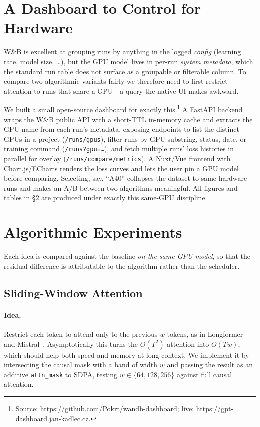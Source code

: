 \documentclass[11pt]{article}
\begin{document}
\section{A Dashboard to Control for Hardware}
\label{sec:dashboard}

W\&B is excellent at grouping runs by anything in the logged \emph{config}
(learning rate, model size, \dots), but the GPU model lives in per-run
\emph{system metadata}, which the standard run table does not surface as a
groupable or filterable column. To compare two algorithmic variants fairly we
therefore need to first restrict attention to runs that share a GPU---a query the
native UI makes awkward.

We built a small open-source dashboard for exactly this.\footnote{Source:
\url{https://github.com/Pokrt/wandb-dashboard}; live:
\url{https://gpt-dashboard.jan-kadlec.cz}.} A FastAPI backend wraps the W\&B public
API with a short-TTL in-memory cache and extracts the GPU name from each run's
metadata, exposing endpoints to list the distinct GPUs in a project
(\texttt{/runs/gpus}), filter runs by GPU substring, status, date, or training
command (\texttt{/runs?gpu=\dots}), and fetch multiple runs' loss histories in
parallel for overlay (\texttt{/runs/compare/metrics}). A Nuxt/Vue frontend with
Chart.js/ECharts renders the loss curves and lets the user pin a GPU model before
comparing. Selecting, say, ``A40'' collapses the dataset to same-hardware runs and
makes an A/B between two algorithms meaningful. All figures and tables in
\S\ref{sec:experiments} are produced under exactly this same-GPU discipline.

\section{Algorithmic Experiments}
\label{sec:experiments}

Each idea is compared against the baseline \emph{on the same GPU model}, so that
the residual difference is attributable to the algorithm rather than the
scheduler.

\subsection{Sliding-Window Attention}

\paragraph{Idea.} Restrict each token to attend only to the previous $w$ tokens,
as in Longformer~\cite{beltagy2020longformer} and Mistral~\cite{jiang2023mistral}.
Asymptotically this turns the $O(T^2)$ attention into $O(Tw)$, which should help
both speed and memory at long context. We implement it by intersecting the causal
mask with a band of width $w$ and passing the result as an additive
\texttt{attn\_mask} to SDPA, testing $w\in\{64,128,256\}$ against full causal
attention.
\end{document}
